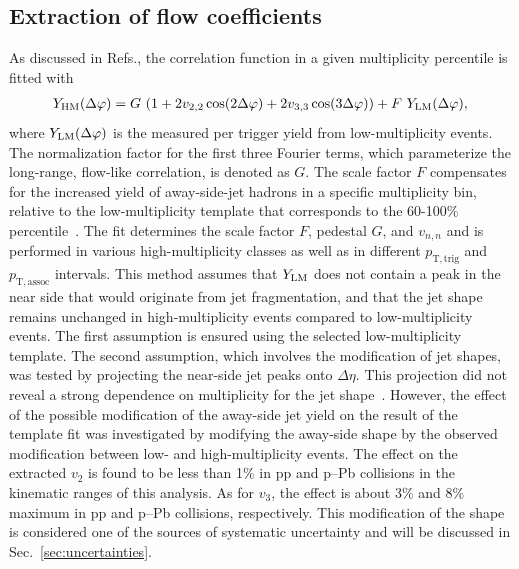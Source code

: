 \subsection{Extraction of flow coefficients}

As discussed in Refs.\cite{ATLAS:2015hzw,ATLAS:2016yzd}, the correlation function in a given multiplicity percentile is fitted with 
\begin{eqnarray}
\label{eq:narray}
Y_{\rm{HM}}(\Delta\varphi) = G~(1 + 2v_{2,2}\cos(2\Delta\varphi) + 2v_{3,3}\cos(3\Delta\varphi)) + F~Y_{\rm{LM}}(\Delta\varphi),
\label{eq:tmpfit}
\end{eqnarray}
where $Y_{\rm{LM}}(\Delta\varphi)$ is the measured per trigger yield from low-multiplicity events. The normalization factor for the first three Fourier terms, which parameterize the long-range, flow-like correlation, is denoted as $G$. The scale factor $F$ compensates for the increased yield of away-side-jet hadrons in a specific multiplicity bin, relative to the low-multiplicity template that corresponds to the 60-100\% percentile~\cite{ALICE:2013tla,ALICE:2014mas}.
The fit determines the scale factor $F$, pedestal $G$, and $v_{n,n}$ and is performed in various high-multiplicity classes as well as in different $p_\mathrm{T,trig}$ and $p_\mathrm{T,assoc}$ intervals. 
This method assumes that $Y_{\rm{LM}}$ does not contain a peak in the near side that would originate from jet fragmentation, and that the jet shape remains unchanged in high-multiplicity events compared to low-multiplicity events. The first assumption is ensured using the selected low-multiplicity template. The second assumption, which involves the modification of jet shapes, was tested by projecting the near-side jet peaks onto $\Delta\eta$. This projection did not reveal a strong dependence on multiplicity for the jet shape~\cite{LAKOMOV2017329}. However, the effect of the possible modification of the away-side jet yield on the result of the template fit was investigated by modifying the away-side shape by the observed modification between low- and high-multiplicity events. The effect on the extracted $v_2$ is found to be less than 1$\%$ in pp and p--Pb collisions in the kinematic ranges of this analysis. As for $v_3$, the effect is about 3\% and 8$\%$ maximum in pp and p--Pb collisions, respectively.  This modification of the shape is considered one of the sources of systematic uncertainty and will be discussed in Sec.~\ref{sec:uncertainties}.


